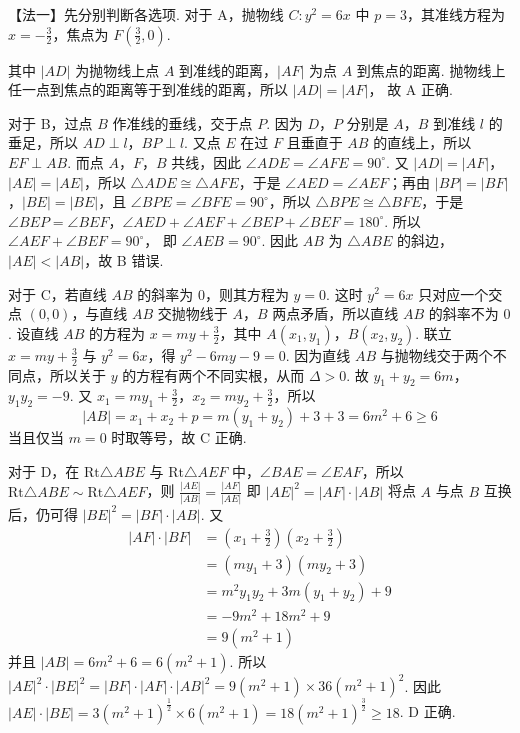 \documentclass[UTF8,a4paper,oneside,11pt]{ctexbook}
\begin{document}
\begin{solution}
【法一】先分别判断各选项. 对于 A，抛物线 \(C: y^2 = 6x\) 中 \(p = 3\)，其准线方程为 \(x = -\frac{3}{2}\)，焦点为 \(F\left(\frac{3}{2},0\right)\).


其中 \(|AD|\) 为抛物线上点 \(A\) 到准线的距离，\(|AF|\) 为点 \(A\) 到焦点的距离. 抛物线上任一点到焦点的距离等于到准线的距离，所以
\(|AD| = |AF|\)，
故 A 正确.

对于 B，过点 \(B\) 作准线的垂线，交于点 \(P\). 因为 \(D\)，\(P\) 分别是 \(A\)，\(B\) 到准线 \(l\) 的垂足，所以 \(AD \perp l\)，\(BP \perp l\). 又点 \(E\) 在过 \(F\) 且垂直于 \(AB\) 的直线上，所以 \(EF \perp AB\). 而点 \(A\)，\(F\)，\(B\) 共线，因此
\(\angle ADE=\angle AFE=90^\circ\).
又 \(|AD| = |AF|\)，\(|AE| = |AE|\)，所以 \(\triangle ADE \cong \triangle AFE\)，于是 \(\angle AED = \angle AEF\)；再由 \(|BP| = |BF|\)，\(|BE| = |BE|\)，且 \(\angle BPE = \angle BFE = 90^\circ\)，所以 \(\triangle BPE \cong \triangle BFE\)，于是 \(\angle BEP = \angle BEF\)，\(\angle AED + \angle AEF + \angle BEP + \angle BEF = 180^\circ\).
所以
\(\angle AEF + \angle BEF = 90^\circ\)，
即 \(\angle AEB = 90^\circ\). 因此 \(AB\) 为 \(\triangle ABE\) 的斜边，\(|AE| < |AB|\)，故 B 错误.

对于 C，若直线 \(AB\) 的斜率为 \(0\)，则其方程为 \(y=0\). 这时 \(y^2=6x\) 只对应一个交点 \((0,0)\)，与直线 \(AB\) 交抛物线于 \(A\)，\(B\) 两点矛盾，所以直线 \(AB\) 的斜率不为 \(0\). 设直线 \(AB\) 的方程为 \(x = my + \frac{3}{2}\)，其中 \(A(x_1, y_1)\)，\(B(x_2, y_2)\). 联立 \(x = my + \frac{3}{2}\) 与 \(y^2 = 6x\)，得
\(y^2 - 6my - 9 = 0\).
因为直线 \(AB\) 与抛物线交于两个不同点，所以关于 \(y\) 的方程有两个不同实根，从而 \(\Delta > 0\). 故 \(y_1 + y_2 = 6m\)，\(y_1y_2 = -9\). 又 \(x_1 = my_1 + \frac{3}{2}\)，\(x_2 = my_2 + \frac{3}{2}\)，所以
\[
|AB|=x_1+x_2+p=m(y_1+y_2)+3+3=6m^2+6\ge 6
\]
当且仅当 \(m = 0\) 时取等号，故 C 正确.

对于 D，在 \(\mathrm{Rt}\triangle ABE\) 与 \(\mathrm{Rt}\triangle AEF\) 中，\(\angle BAE = \angle EAF\)，所以 \(\mathrm{Rt}\triangle ABE \sim \mathrm{Rt}\triangle AEF\)，则
\(
\frac{|AE|}{|AB|}=\frac{|AF|}{|AE|}
\)
即
\(
|AE|^2=|AF| \cdot |AB|
\)
将点 \(A\) 与点 \(B\) 互换后，仍可得 \( |BE|^2 = |BF| \cdot |AB| \). 又
\begin{align*}
    |AF| \cdot |BF|
    &=\left(x_1 + \frac{3}{2}\right)\left(x_2 + \frac{3}{2}\right) \\
    &=(my_1 + 3)(my_2 + 3) \\
    &=m^2 y_1 y_2 + 3m(y_1 + y_2) + 9 \\
    &=-9m^2 + 18m^2 + 9 \\
    &=9(m^2 + 1)
\end{align*}
并且 \(|AB| = 6m^2 + 6 = 6(m^2 + 1)\).
所以 \(|AE|^2 \cdot |BE|^2 = |BF| \cdot |AF| \cdot |AB|^2 = 9(m^2 + 1) \times 36(m^2 + 1)^2\).
因此 \(|AE| \cdot |BE| = 3(m^2 + 1)^{\frac{1}{2}} \times 6(m^2 + 1) = 18(m^2 + 1)^{\frac{3}{2}} \ge 18\).
D 正确.


\end{solution}
\end{document}
